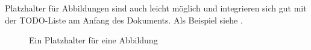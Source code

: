 Platzhalter für Abbildungen sind auch leicht möglich und integrieren sich gut mit der TODO-Liste am Anfang des Dokuments. Als Beispiel siehe
.

\begin{figure}
    \centering
    \caption{Ein Platzhalter für eine Abbildung}
    \label{fig:missing}
\end{figure}

